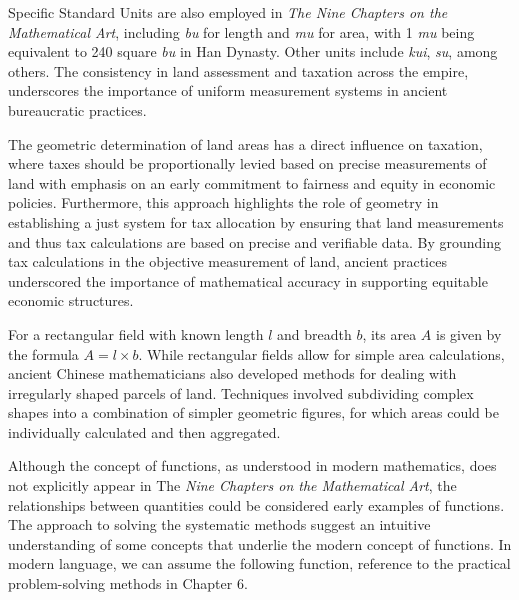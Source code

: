 \documentclass[10pt]{article}
\begin{document}
\vspace{5pt}

Specific Standard Units are also employed in \textit{The Nine Chapters on the Mathematical Art}, including \textit{bu} for length and \textit{mu} for area, with 1 \textit{mu} being equivalent to 240 square \textit{bu} in Han Dynasty. Other units include \textit{kui}, \textit{su}, among others. The consistency in land assessment and taxation across the empire, underscores the importance of uniform measurement systems in ancient bureaucratic practices. \autocite[p.~191]{Martzloff_2006}

\vspace{5pt}

The geometric determination of land areas has a direct influence on taxation, where taxes should be proportionally levied based on precise measurements of land with emphasis on an early commitment to fairness and equity in economic policies. Furthermore, this approach highlights the role of geometry in establishing a just system for tax allocation by ensuring that land measurements and thus tax calculations are based on precise and verifiable data. By grounding tax calculations in the objective measurement of land, ancient practices underscored the importance of mathematical accuracy in supporting equitable economic structures.

\vspace{5pt}

For a rectangular field with known length \( l \) and breadth \( b \), its area \( A \) is given by the formula \( A = l \times b \). While rectangular fields allow for simple area calculations, ancient Chinese mathematicians also developed methods for dealing with irregularly shaped parcels of land. Techniques involved subdividing complex shapes into a combination of simpler geometric figures, for which areas could be individually calculated and then aggregated. 


\vspace{7pt}

Although the concept of functions, as understood in modern mathematics, does not explicitly appear in The \textit{Nine Chapters on the Mathematical Art}, the relationships between quantities could be considered early examples of functions. The approach to solving the systematic methods suggest an intuitive understanding of some concepts that underlie the modern concept of functions. In modern language, we can assume the following function, reference to the practical problem-solving methods in Chapter 6.
\end{document}
